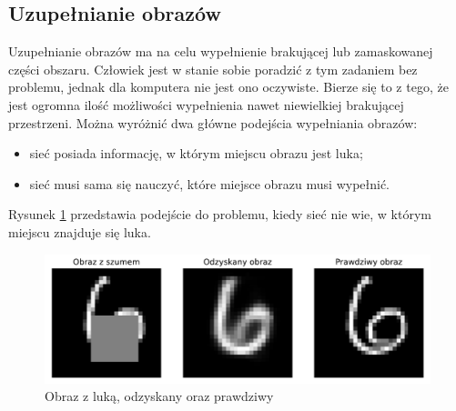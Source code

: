 \documentclass[a4paper,12pt,oneside]{book} %
\begin{document}
\subsection{Uzupełnianie obrazów}
Uzupełnianie obrazów ma na celu wypełnienie brakującej lub zamaskowanej części obszaru. Człowiek jest w stanie sobie poradzić z tym zadaniem bez problemu, jednak dla komputera nie jest ono oczywiste. Bierze się to z tego, że jest ogromna ilość możliwości wypełnienia nawet niewielkiej brakującej przestrzeni. 
Można wyróżnić dwa główne podejścia wypełniania obrazów:
\begin{itemize}
	\item sieć posiada informację, w którym miejscu obrazu jest luka;
	\item sieć musi sama się nauczyć, które miejsce obrazu musi wypełnić.
\end{itemize}
Rysunek \ref{fig:lukaae} przedstawia podejście do problemu, kiedy sieć nie wie, w którym miejscu znajduje się luka. 
\begin{figure}[h]
	\centering\includegraphics[width=14.5cm]{completionae.pdf}
	\caption{Obraz z luką, odzyskany oraz prawdziwy}
	\label{fig:lukaae}
\end{figure}
\end{document}

